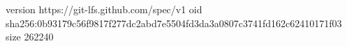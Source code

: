 version https://git-lfs.github.com/spec/v1
oid sha256:0b93179c56f9817f277dc2abd7e5504fd3da3a0807c3741fd162c62410171f03
size 262240

